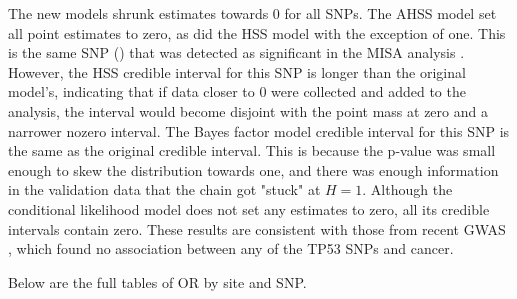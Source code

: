 \documentclass[AMA,STIX1COL]{WileyNJD-v2}\usepackage[]{graphicx}\usepackage[]{color}
\begin{document}
The new models shrunk estimates towards 0 for all SNPs. The AHSS model set all point estimates to zero, as did the HSS model with the exception of one. This is the same SNP () 
that was detected as significant in the MISA analysis \cite{schildkraut2010association}. However, the HSS credible interval for this SNP is longer than the original model's, indicating that if data closer to 0 were collected and added to the analysis, the interval would become disjoint with the point mass at zero and a narrower nozero interval.  The Bayes factor model credible interval for this SNP is the same as the original credible interval. This is because the p-value was small enough to skew the distribution towards one, and there was enough information in the validation data that the chain got "stuck" at $H = 1$. Although the conditional likelihood model does not set any estimates to zero, all its credible intervals contain zero. These results are consistent with those from recent GWAS \cite{phelan2017identification}, which found no association between any of the TP53 SNPs and cancer.

Below are the full tables of OR by site and SNP.
\end{document}
